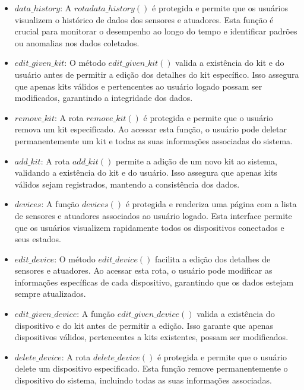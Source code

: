 \documentclass[conference, a4paper, 12pt]{IEEEtran}
\begin{document}
\begin{itemize}
          \item $data\_history$: A $rota data\_history()$ é protegida e permite que os usuários visualizem o histórico de dados dos sensores e atuadores. Esta função é crucial para monitorar o desempenho ao longo do tempo e identificar padrões ou anomalias nos dados coletados.
      
          \item $edit\_given\_kit$: O método $edit\_given\_kit()$ valida a existência do kit e do usuário antes de permitir a edição dos detalhes do kit específico. Isso assegura que apenas kits válidos e pertencentes ao usuário logado possam ser modificados, garantindo a integridade dos dados.
      
          \item $remove\_kit$: A rota $remove\_kit()$ é protegida e permite que o usuário remova um kit especificado. Ao acessar esta função, o usuário pode deletar permanentemente um kit e todas as suas informações associadas do sistema.
      
          \item $add\_kit$: A rota $add\_kit()$ permite a adição de um novo kit ao sistema, validando a existência do kit e do usuário. Isso assegura que apenas kits válidos sejam registrados, mantendo a consistência dos dados.
      
          \item $devices$: A função $devices()$ é protegida e renderiza uma página com a lista de sensores e atuadores associados ao usuário logado. Esta interface permite que os usuários visualizem rapidamente todos os dispositivos conectados e seus estados.
      
          \item $edit\_device$: O método $edit\_device()$ facilita a edição dos detalhes de sensores e atuadores. Ao acessar esta rota, o usuário pode modificar as informações específicas de cada dispositivo, garantindo que os dados estejam sempre atualizados.
      
          \item $edit\_given\_device$: A função $edit\_given\_device()$ valida a existência do dispositivo e do kit antes de permitir a edição. Isso garante que apenas dispositivos válidos, pertencentes a kits existentes, possam ser modificados.
      
          \item $delete\_device$: A rota $delete\_device()$ é protegida e permite que o usuário delete um dispositivo especificado. Esta função remove permanentemente o dispositivo do sistema, incluindo todas as suas informações associadas.
      

\end{itemize}
\end{document}
